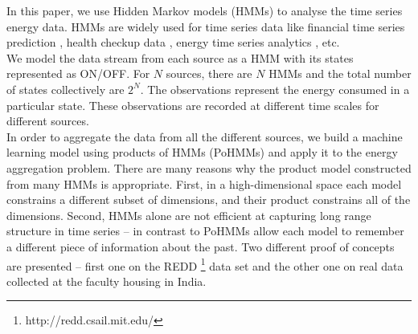 \documentclass[conference]{IEEEtran}
\begin{document}
In this paper, we use Hidden Markov models (HMMs) to analyse the time series energy data. HMMs are widely used for time series data like financial time series prediction \cite{SS97a}, health checkup data \cite{Kawamoto}, energy time series analytics \cite{Albert}, etc.\\
We model the data stream from each source as a HMM with its states represented as ON/OFF.  For $N$ sources, there are $N$ HMMs and  the total number of states collectively are $2^N$. The observations represent the energy consumed in a particular state. These observations are recorded at different time scales for different sources. \\
In order to aggregate the data from all the different sources, we build a machine learning model using products of HMMs (PoHMMs) and apply it to the energy aggregation problem. There are many reasons why the product model constructed from many HMMs is appropriate. 
First, in a high-dimensional space each model constrains a different subset of dimensions, and their product constrains all of the dimensions.
Second, HMMs alone are not efficient at capturing long range structure in time series \cite{Taylor} -- in contrast to PoHMMs  \cite{andrew} allow each model to remember a different piece of information about the past.
Two different proof of concepts are presented -- first one on the REDD \footnote{http://redd.csail.mit.edu/} data set and the other one on real data collected at the faculty housing in India. 

\end{document}
